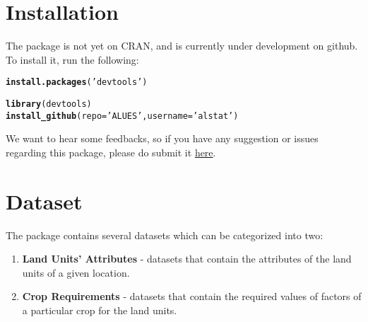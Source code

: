 \documentclass[11pt,fleqn]{article}\usepackage[]{graphicx}\usepackage[]{color}
\makeatletter
\newcommand{\hlstr}[1]{\textcolor[rgb]{0.192,0.494,0.8}{#1}}%
\newcommand{\hlstd}[1]{\textcolor[rgb]{0.345,0.345,0.345}{#1}}%
\newcommand{\hlkwc}[1]{\textcolor[rgb]{0.333,0.667,0.333}{#1}}%
\newcommand{\hlkwd}[1]{\textcolor[rgb]{0.737,0.353,0.396}{\textbf{#1}}}%
\newenvironment{kframe}{%
 \def\at@end@of@kframe{}%
 \ifinner\ifhmode%
  \def\at@end@of@kframe{\end{minipage}}%
  \begin{minipage}{\columnwidth}%
 \fi\fi%
 \def\FrameCommand##1{\hskip\@totalleftmargin \hskip-\fboxsep
 \colorbox{shadecolor}{##1}\hskip-\fboxsep
     \hskip-\linewidth \hskip-\@totalleftmargin \hskip\columnwidth}%
 \MakeFramed {\advance\hsize-\width
   \@totalleftmargin\z@ \linewidth\hsize
   \@setminipage}}%
 {\par\unskip\endMakeFramed%
 \at@end@of@kframe}
\newenvironment{knitrout}{}{} %
\makeatother
\begin{document}
\section{Installation}
The package is not yet on CRAN, and is currently under development on github. To install it, run the following:
\begin{knitrout}
\color{fgcolor}\begin{kframe}
\begin{alltt}
\hlkwd{install.packages}\hlstd{(}\hlstr{'devtools'}\hlstd{)}

\hlkwd{library}\hlstd{(devtools)}
\hlkwd{install_github}\hlstd{(}\hlkwc{repo} \hlstd{=} \hlstr{'ALUES'}\hlstd{,} \hlkwc{username} \hlstd{=} \hlstr{'alstat'}\hlstd{)}
\end{alltt}
\end{kframe}
\end{knitrout}
We want to hear some feedbacks, so if you have any suggestion or issues regarding this package, please do submit it \href{https://github.com/alstat/ALUES/issues}{here}.
\section{Dataset}
The package contains several datasets which can be categorized into two:
\begin{enumerate}
\item \textbf{Land Units' Attributes} - datasets that contain the attributes of the land units of a given location.
\item \textbf{Crop Requirements} - datasets that contain the required values of factors of a particular crop for the land units.
\end{enumerate}
\end{document}
